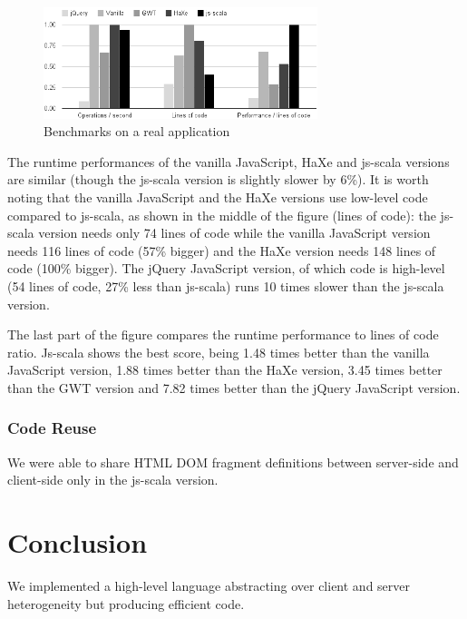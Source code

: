 \documentclass[preprint]{sigplanconf}
\begin{document}
\begin{figure}
\centering
\includegraphics[width=8cm]{chooze.png}
\caption{Benchmarks on a real application}
\label{benchmark}
\end{figure}

The runtime performances of the vanilla JavaScript, HaXe and js-scala versions are similar (though
the js-scala version is slightly slower by 6\%). It is worth noting that the vanilla JavaScript and
the HaXe versions use low-level code compared to js-scala, as shown in the middle of the figure
(lines of code): the js-scala version needs only 74 lines of code while the vanilla JavaScript
version needs 116 lines of code (57\% bigger) and the HaXe version needs 148 lines of code (100\%
bigger). The jQuery JavaScript version, of which code is high-level (54 lines of code, 27\% less
than js-scala) runs 10 times slower than the js-scala version.

The last part of the figure compares the runtime performance to lines of code ratio. Js-scala shows
the best score, being 1.48 times better than the vanilla JavaScript version, 1.88 times better than
the HaXe version, 3.45 times better than the GWT version and 7.82 times better than the jQuery
JavaScript version.

\subsubsection{Code Reuse}

We were able to share HTML DOM fragment definitions between server-side and client-side only in the
js-scala version.

\section{Conclusion}
\label{sec:conclusion}

We implemented a high-level language abstracting over client and server heterogeneity but producing
efficient code.

%
%
%



%
%
%
\end{document}
